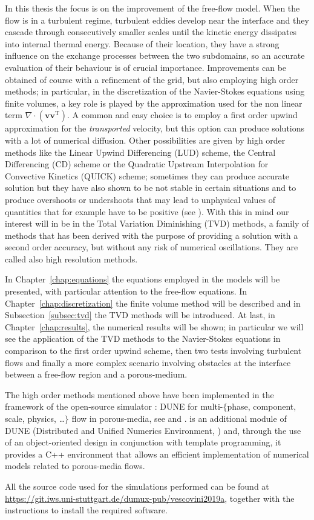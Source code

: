 In this thesis the focus is on the improvement of the free-flow model. When the 
flow is in a turbulent regime, turbulent eddies develop near the interface and 
they cascade through consecutively smaller scales until the kinetic energy 
dissipates into internal thermal energy. Because of their location, they have 
a strong influence on the exchange processes between the two subdomains, so an 
accurate evaluation of their behaviour is of crucial importance. Improvements 
can be obtained of course with a refinement of the grid, but also employing 
high order methods; in 
particular, in the discretization of the Navier-Stokes equations using finite 
volumes, a key role is played by the approximation used for the non linear term 
$\nabla \cdot (\mathbf{v} \mathbf{v}^\mathrm{T})$. A common and easy 
choice is to employ a first order upwind approximation for the 
\emph{transported} velocity, but this option can produce solutions with a lot 
of numerical diffusion. Other possibilities are given by high order methods 
like the Linear Upwind Differencing (LUD) scheme, the Central Differencing (CD) 
scheme or the Quadratic Upstream Interpolation for Convective Kinetics (QUICK) 
scheme; sometimes they can produce 
accurate solution but they have also shown to be not stable in certain 
situations and to produce overshoots or undershoots that 
may lead to unphysical values of quantities that for example have to be 
positive (see \cite{main:vermal}). With this in mind our interest will in be in 
the Total Variation Diminishing (TVD) methods, a family of methods that has 
been derived with the purpose of providing a solution with a second order 
accuracy, but without any risk of numerical oscillations. They are called also 
high resolution methods.

In Chapter~\ref{chap:equations} the equations employed in the models will be 
presented, with particular attention to the free-flow equations. In 
Chapter~\ref{chap:discretization} the finite volume method will be described 
and in Subsection~\ref{subsec:tvd} the TVD methods will be introduced. At last, 
in Chapter~\ref{chap:results}, the numerical results will be shown; in 
particular we will see the application of the TVD methods to the Navier-Stokes 
equations in comparison to the first order upwind scheme, then two tests 
involving turbulent flows and finally a more complex scenario involving 
obstacles at the interface between a free-flow region and a porous-medium.

The high order methods mentioned above have been implemented in the framework 
of the open-source simulator \DUMUX: DUNE for multi-$\{$phase, component, 
scale, physics, \dots$\}$ flow in porous-media, see \cite{dumux:tutti} and 
\cite{dumux:flemisch}. \DUMUX is an 
additional module of DUNE (Distributed and Unified Numerics Environment, 
\cite{web:dune}) and, through the use of an object-oriented design in 
conjunction with template programming, it provides a C++ environment that 
allows 
an efficient implementation of numerical models related to porous-media flows.

All the source code used for the simulations performed can be 
found at \url{https://git.iws.uni-stuttgart.de/dumux-pub/vescovini2019a}, 
together with the instructions to install the required software.